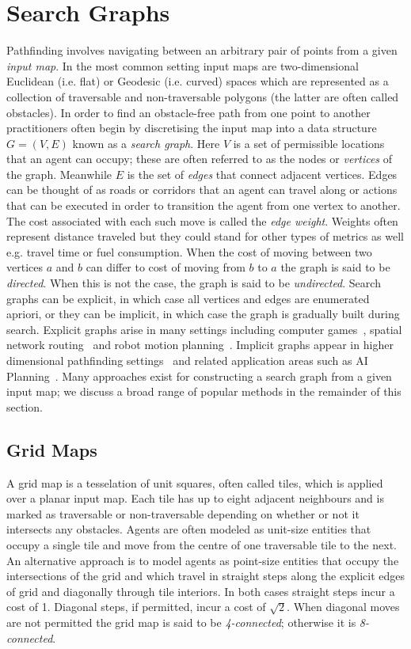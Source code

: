 \section{Search Graphs}
\label{cha::lit::graphs}
Pathfinding involves navigating between an arbitrary pair of points from a given 
\emph{input map}.
In the most common setting input maps are two-dimensional Euclidean
(i.e. flat) or Geodesic (i.e. curved) spaces which are represented as a
collection of traversable and non-traversable polygons (the latter are often
called obstacles).
In order to find an obstacle-free path from one point to another practitioners
often begin by discretising the input map into a data structure $G = (V, E)$ 
known as a \emph{search
graph}. Here $V$ is a set of permissible locations that an agent can occupy;
these are often referred to as the nodes or \emph{vertices} of the graph.
Meanwhile $E$ is the set of \emph{edges} that connect adjacent vertices.  Edges
can be thought of as roads or corridors that an agent can travel along or
actions that can be executed in order to transition the agent from one vertex to
another.
The cost associated with each such move is called the \emph{edge weight}.
Weights often represent distance traveled but they could stand for other types
of metrics as well e.g. travel time or fuel consumption.  When the cost of
moving between two vertices $a$ and $b$ can differ to cost of moving from $b$ to
$a$ the graph is said to be \emph{directed}.  When this is not the case, the
graph is said to be \emph{undirected}.  Search graphs can be explicit, in which
case all vertices and edges are enumerated apriori, or they can be implicit, in
which case the graph is gradually built during search. Explicit graphs arise in
many settings including computer games~\citep{davis00,tozour02,champandard09},
spatial network routing~\citep{sanders05,goldberg06} and robot motion
planning~\citep{latombe91,choset05}.  Implicit graphs appear in higher
dimensional pathfinding settings~\citep{lavalle98,bohlin00} and related
application areas such as AI Planning~\citep{russel03}.  
Many approaches exist for constructing a search graph from a given input map; we
discuss a broad range of popular methods in the remainder of this section.

\subsection{Grid Maps}
\label{cha::lit::graphs::grid}
A grid map is a tesselation of unit squares, often called tiles, which is
applied over a planar input map. Each tile has up to eight adjacent neighbours
and is marked as traversable or non-traversable depending on whether or not it
intersects any obstacles.  Agents are often modeled as unit-size entities that
occupy a single tile and move from the centre of one traversable tile to the
next.  
An alternative approach is to model agents as point-size entities that occupy 
the intersections of the grid and which travel in straight steps along the
explicit edges of grid and diagonally through tile interiors.
In both cases straight steps incur a cost of 1. Diagonal steps, if permitted, 
incur a cost of $\sqrt{2}$.  When diagonal moves are not permitted the grid map 
is said to be \emph{4-connected}; otherwise it is \emph{8-connected}.  

